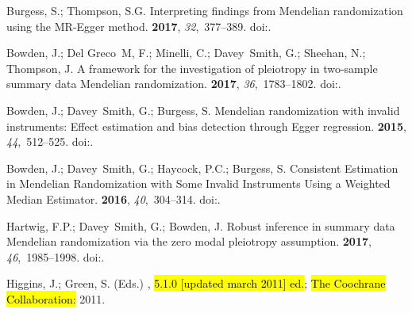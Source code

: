 \documentclass[genes,article,accept,moreauthors,pdftex]{Definitions/mdpi}
\begin{document}
\begin{thebibliography}{999}
Burgess, S.; Thompson, S.G.
\newblock Interpreting findings from {Mendelian} randomization using the
  {MR}-{Egger} method.
 {\bf 2017}, {\em
  32},~377--389.
\newblock
  doi:{\href{https://doi.org/10.1007/s10654-017-0255-x}{}}.

Bowden, J.; Del Greco~M, F.; Minelli, C.; Davey~Smith, G.; Sheehan, N.;
  Thompson, J.
\newblock A framework for the investigation of pleiotropy in two-sample summary
  data {Mendelian} randomization.
 {\bf 2017}, {\em 36},~1783--1802.
\newblock
  doi:{\href{https://doi.org/10.1002/sim.7221}{}}.

Bowden, J.; Davey~Smith, G.; Burgess, S.
\newblock Mendelian randomization with invalid instruments: Effect estimation
  and bias detection through {Egger} regression.
 {\bf 2015}, {\em
  44},~512--525.
\newblock
  doi:{\href{https://doi.org/10.1093/ije/dyv080}{}}.

Bowden, J.; Davey~Smith, G.; Haycock, P.C.; Burgess, S.
\newblock Consistent {Estimation} in {Mendelian} {Randomization} with {Some}
  {Invalid} {Instruments} {Using} a {Weighted} {Median} {Estimator}.
 {\bf 2016}, {\em 40},~304--314.
\newblock
  doi:{\href{https://doi.org/10.1002/gepi.21965}{}}.

Hartwig, F.P.; Davey~Smith, G.; Bowden, J.
\newblock Robust inference in summary data {Mendelian} randomization via the
  zero modal pleiotropy assumption.
 {\bf 2017}, {\em
  46},~1985--1998.
\newblock
  doi:{\href{https://doi.org/10.1093/ije/dyx102}{}}.

Higgins, J.; Green, S. (Eds.)
, \hl{5.1.0 [updated march 2011] ed.}; \hl{The Coochrane
  Collaboration:}  2011.%


\end{thebibliography}
\end{document}
